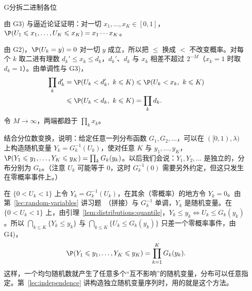 \begin{probleme}{G}{分拆二进制各位}
\begin{questions}
\begin{solution}
\end{solution}
\item 由 G3) 与逼近论证证明：对一切 $x_1,\dots,x_K\in[0,1]$，$\P(U_1\leqslant x_1,\dots,U_K\leqslant x_K)=x_1\cdots x_K$。
\begin{solution}
由 G2)，$\P(U_k=y)=0$ 对一切 $y$ 成立，所以把 $\leqslant$ 换成 $<$ 不改变概率。对每个 $k$ 取二进有理数 $d_k'\leqslant x_k\leqslant d_k$，$d_k'$、$d_k$ 与 $x_k$ 相差不超过 $2^{-M}$（$x_k=1$ 时取 $d_k=1$）。由单调性与 G3)，
\[
\begin{aligned}
\prod_kd_k'&=\P(U_k<d_k',\ k\leqslant K)\leqslant \P(U_k<x_k,\ k\leqslant K)\\
&\leqslant \P(U_k<d_k,\ k\leqslant K)=\prod_kd_k .
\end{aligned}
\]
令 $M\to\infty$，两端都趋于 $\prod_kx_k$。
\end{solution}
\item 结合分位数变换，说明：给定任意一列分布函数 $G_1,G_2,\dots$，可以在 $([0,1),\lambda)$ 上构造随机变量 $Y_k=G_k^{-1}(U_k)$，使对任意 $K$ 与 $y_1,\dots,y_K$，$\P(Y_1\leqslant y_1,\dots,Y_K\leqslant y_K)=\prod_kG_k(y_k)$。以后我们会说：$Y_1,Y_2,\dots$ 是独立的，分布分别为 $G_k$。（注意 $U_k$ 可能等于 $0$，这时 $G_k^{-1}(0)$ 需要另外约定，但这只发生在零概率事件上。）
\begin{solution}
在 $\{0<U_k<1\}$ 上令 $Y_k=G_k^{-1}(U_k)$，在其余（零概率）的地方令 $Y_k=0$。由第~\ref{lec:random-variables} 讲习题~（拼接）与 $G_k^{-1}$ 单调，$Y_k$ 是随机变量。在 $\{0<U_k<1\}$ 上，由引理~\ref{lem:distributions:quantile}，$Y_k\leqslant y_k\iff U_k\leqslant G_k(y_k)$。所以 $\bigcap_{k\leqslant K}\{Y_k\leqslant y_k\}$ 与 $\bigcap_{k\leqslant K}\{U_k\leqslant G_k(y_k)\}$ 只差一个零概率事件，由 G4)，
\[
\P(Y_1\leqslant y_1,\dots,Y_K\leqslant y_K)=\prod_{k=1}^KG_k(y_k).
\]
这样，一个均匀随机数就产生了任意多个“互不影响”的随机变量，分布可以任意指定。第~\ref{lec:independence} 讲构造独立随机变量序列时，用的就是这个方法。
\end{solution}
\end{questions}
\end{probleme}

